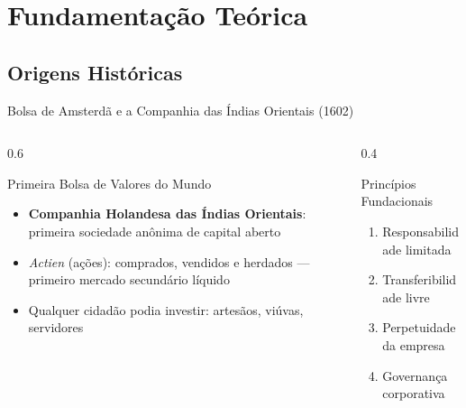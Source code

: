 \documentclass{libs/ufc_format}
\begin{document}
\section{Fundamentação Teórica}

\subsection{Origens Históricas}
\begin{frame}{Bolsa de Amsterdã e a Companhia das Índias Orientais (1602)}
    \vspace{-0.3cm}
    \begin{columns}
        \begin{column}{0.6\textwidth}
            \begin{block}{Primeira Bolsa de Valores do Mundo}
                \begin{itemize}
                    \item \textbf{Companhia Holandesa das Índias Orientais}: primeira sociedade anônima de capital aberto \cite{dejong2005}
                    \item \textit{Actien} (ações): comprados, vendidos e herdados --- primeiro mercado secundário líquido \cite{petram2014}
                    \item Qualquer cidadão podia investir: artesãos, viúvas, servidores
                \end{itemize}
            \end{block}
        \end{column}
        \begin{column}{0.4\textwidth}
            \begin{exampleblock}{Princípios Fundacionais}
                \begin{enumerate}
                    \item Responsabilidade limitada
                    \item Transferibilidade livre
                    \item Perpetuidade da empresa
                    \item Governança corporativa
                \end{enumerate}
            \end{exampleblock}
        \end{column}
    \end{columns}

    \vspace{0cm}

\end{frame}
\end{document}
